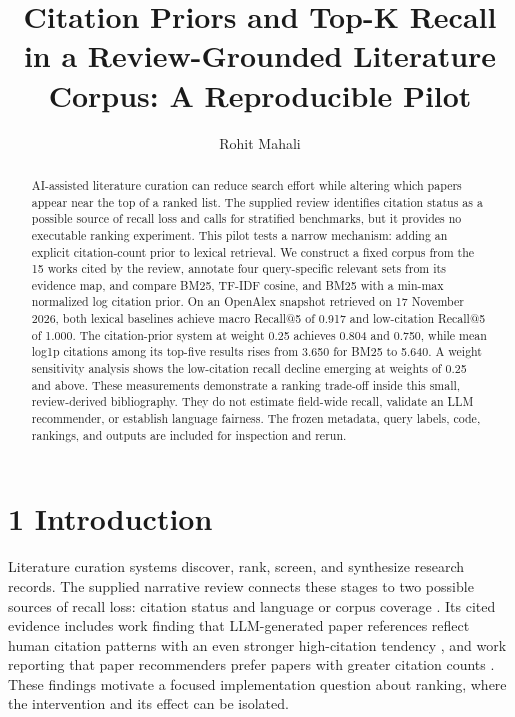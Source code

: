 \documentclass[acmsmall,nonacm]{acmart}
\title{Citation Priors and Top-K Recall in a Review-Grounded Literature Corpus: A Reproducible Pilot}
\author{Rohit Mahali}
\affiliation{\institution{Indian Institute of Information Technology Allahabad}\city{Prayagraj}\country{India}}
\begin{document}
\begin{abstract}AI-assisted literature curation can reduce search effort while altering which papers appear near the top of a ranked list. The supplied review identifies citation status as a possible source of recall loss and calls for stratified benchmarks, but it provides no executable ranking experiment. This pilot tests a narrow mechanism: adding an explicit citation-count prior to lexical retrieval. We construct a fixed corpus from the 15 works cited by the review, annotate four query-specific relevant sets from its evidence map, and compare BM25, TF-IDF cosine, and BM25 with a min-max normalized log citation prior. On an OpenAlex snapshot retrieved on 17 November 2026, both lexical baselines achieve macro Recall@5 of 0.917 and low-citation Recall@5 of 1.000. The citation-prior system at weight 0.25 achieves 0.804 and 0.750, while mean log1p citations among its top-five results rises from 3.650 for BM25 to 5.640. A weight sensitivity analysis shows the low-citation recall decline emerging at weights of 0.25 and above. These measurements demonstrate a ranking trade-off inside this small, review-derived bibliography. They do not estimate field-wide recall, validate an LLM recommender, or establish language fairness. The frozen metadata, query labels, code, rankings, and outputs are included for inspection and rerun.\end{abstract}


\maketitle

\section*{1 Introduction}

Literature curation systems discover, rank, screen, and synthesize research records. The supplied narrative review connects these stages to two possible sources of recall loss: citation status and language or corpus coverage \cite{mahali2026review}. Its cited evidence includes work finding that LLM-generated paper references reflect human citation patterns with an even stronger high-citation tendency \cite{algaba2025citation}, and work reporting that paper recommenders prefer papers with greater citation counts \cite{tian2024recommendation}. These findings motivate a focused implementation question about ranking, where the intervention and its effect can be isolated.\par
\end{document}
